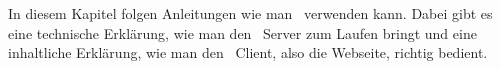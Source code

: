 

In diesem Kapitel folgen Anleitungen wie man \ZELIA\ verwenden kann. Dabei gibt es eine technische Erklärung, wie man den \ZELIA\ Server zum Laufen bringt und eine inhaltliche Erklärung, wie man den \ZELIA\ Client, also die Webseite, richtig bedient.





